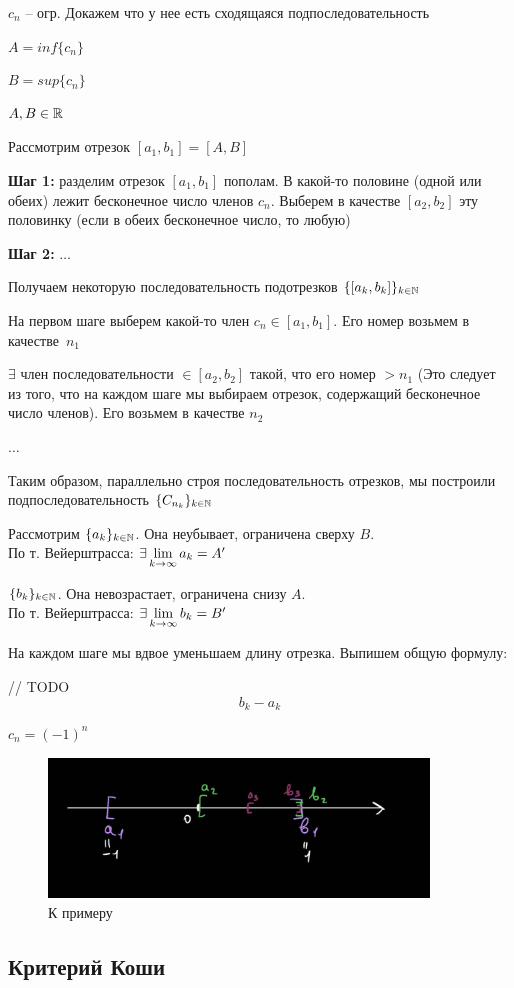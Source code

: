 \begin{Proof}
    $c_n$ -- огр. Докажем что у нее есть сходящаяся подпоследовательность

    $A = inf\{c_n\}$
    
    $B = sup\{c_n\}$

    $A, B \in \mathbb{R}$

    Рассмотрим отрезок $[a_1,b_1] = [A,B]$

    \textbf{Шаг 1:} разделим отрезок $[a_1,b_1]$ пополам. В какой-то половине (одной или обеих) лежит бесконечное число членов $c_n$. Выберем в качестве $[a_2,b_2]$ эту половинку (если в обеих бесконечное число, то любую)

    \textbf{Шаг 2:} $\ldots$

    Получаем некоторую последовательность подотрезков $\{[a_k,b_k]\}_{k \in \mathbb{N}}$

    На первом шаге выберем какой-то член $c_n \in [a_1,b_1]$. Его номер возьмем в качестве~$n_1$

    $\exists$ член последовательности $\in [a_2,b_2]$ такой, что его номер $> n_1$ (Это следует из того, что на каждом шаге мы выбираем отрезок, содержащий бесконечное число членов). Его возьмем в качестве $n_2$

    $\ldots$

    Таким образом, параллельно строя последовательность отрезков, мы построили подпоследовательность $\{C_{n_k}\}_{k\in\mathbb{N}}$

    Рассмотрим $\{a_k\}_{k\in\mathbb{N}}$. Она неубывает, ограничена сверху $B$. \\По т. Вейерштрасса: $\exists \lim\limits_{k \to \infty} a_k = A'$

    $\{b_k\}_{k\in\mathbb{N}}$. Она невозрастает, ограничена снизу $A$. \\По т. Вейерштрасса: $\exists \lim\limits_{k \to \infty} b_k = B'$

    На каждом шаге мы вдвое уменьшаем длину отрезка. Выпишем общую формулу:
    
    // TODO
    $$ b_k - a_k $$
\end{Proof}

\begin{example}
    $c_n = (-1)^n$
\end{example}

\begin{figure}[h]
  \centering
  \includegraphics[width=0.9\textwidth]{lectures/files/lec6-11-28-20.png}
  \caption{К примеру}
  \label{fig:lec6-11-28-20.png}
\end{figure}

\subsection{Критерий Коши}
